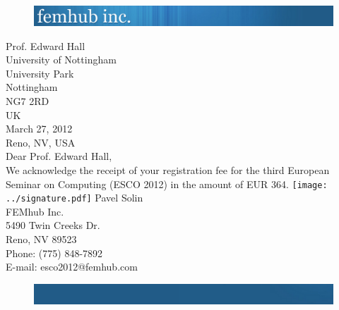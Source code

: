 
\vbox{}
\vspace{-2cm}
\begin{figure}[!ht]
\includegraphics[width=\textwidth]{../femhub_logo.png}
\vspace{1cm}
\end{figure}
\noindent
Prof. Edward Hall\\
University of Nottingham\\
University Park\\
Nottingham\\
NG7 2RD\\
UK\\

\noindent
\hbox{} \hfill March 27, 2012\\
\hbox{} \hfill Reno, NV, USA\\
Dear Prof. Edward Hall,\\
\newline
\noindent
We acknowledge the receipt of your registration fee for the 
third European Seminar on Computing (ESCO 2012) in 
the amount of EUR 364.
\newline
\vspace{1cm}
\newline
\hbox{}
\hspace{-4mm}
\texttt{[image: ../signature.pdf]}
\newline
\noindent
Pavel Solin\\
FEMhub Inc.\\
5490 Twin Creeks Dr.\\
Reno, NV 89523\\
Phone: (775) 848-7892\\
E-mail: esco2012@femhub.com
\begin{figure}[!ht]
\includegraphics[width=\textwidth]{../femhub_footer.png}
\vspace{1cm}
\end{figure}
